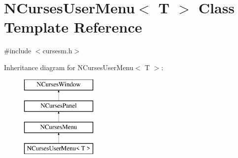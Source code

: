 \hypertarget{class_n_curses_user_menu}{\section{N\-Curses\-User\-Menu$<$ T $>$ Class Template Reference}
\label{class_n_curses_user_menu}
}


{\ttfamily \#include $<$cursesm.\-h$>$}

Inheritance diagram for N\-Curses\-User\-Menu$<$ T $>$\-:\begin{figure}[H]
\begin{center}
\leavevmode
\includegraphics[height=4.000000cm]{class_n_curses_user_menu}
\end{center}
\end{figure}
